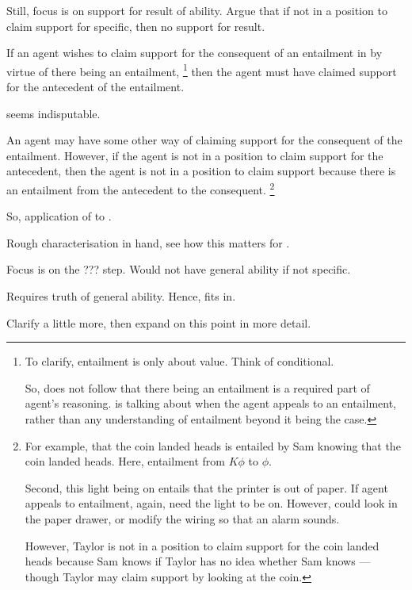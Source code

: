 \begin{note}
  Still, focus is on support for result of ability.
  Argue that if not in a position to claim support for specific, then no support for result.

  \begin{proposition}[\nIm{}]
    If an agent wishes to claim support for the consequent of an entailment in by virtue of there being an entailment,\nolinebreak
    \footnote{To clarify, entailment is only about value.
      Think of conditional.

      So, does not follow that there being an entailment is a required part of agent's reasoning.
      \nIm{} is talking about when the agent appeals to an entailment, rather than any understanding of entailment beyond it being the case.
    }
    then the agent must have claimed support for the antecedent of the entailment.
  \end{proposition}
  \nIm{} seems indisputable.

  An agent may have some other way of claiming support for the consequent of the entailment.
  However, if the agent is not in a position to claim support for the antecedent, then the agent is not in a position to claim support because there is an entailment from the antecedent to the consequent.\nolinebreak
  \footnote{
    For example, that the coin landed heads is entailed by Sam knowing that the coin landed heads.
    Here, entailment from \(K\phi\) to \(\phi\).

    Second, this light being on entails that the printer is out of paper.
    If agent appeals to entailment, again, need the light to be on.
    However, could look in the paper drawer, or modify the wiring so that an alarm sounds.

  However, Taylor is not in a position to claim support for the coin landed heads because Sam knows if Taylor has no idea whether Sam knows --- though Taylor may claim support by looking at the coin.
  }

  So, application of \nI{} to \AR{}.
\end{note}

\begin{note}
  Rough characterisation in hand, see how this matters for \AR{}.

  Focus is on the ??? step.
  Would not have general ability if not specific.

  Requires truth of general ability.
  Hence, fits in.

  Clarify a little more, then expand on this point in more detail.
\end{note}


